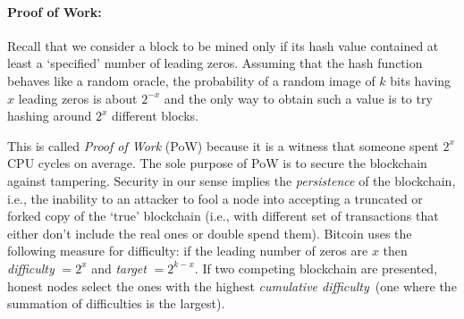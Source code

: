 \documentclass[]{report}   %
\begin{document}
\paragraph{Proof of Work:} Recall that we consider a block to be mined only if its hash value contained at least a `specified' number of leading zeros. Assuming that the hash function behaves like a random oracle, the probability of a random image of $k$ bits having $x$ leading zeros is about $2^{-x}$ and the only way to obtain such a value is to try hashing around $2^x$ different blocks.

This is called {\em Proof of Work} (PoW) because it is a witness that someone spent $2^x$ CPU cycles on average. The sole purpose of PoW is to secure the blockchain against tampering. 
Security in our sense implies the {\em persistence} of the blockchain, i.e., the inability to an attacker to fool a node into accepting a truncated or forked copy of the `true' blockchain (i.e., with different set of transactions that either don't include the real ones or double spend them). Bitcoin uses the following measure for difficulty: if the leading number of zeros are $x$ then {\em difficulty} $=2^{x}$ and {\em target} $=2^{k-x}$. 
If two competing blockchain are presented, honest nodes select the ones with the highest {\em cumulative difficulty}~(one where the summation of difficulties is the largest). 




\end{document}
